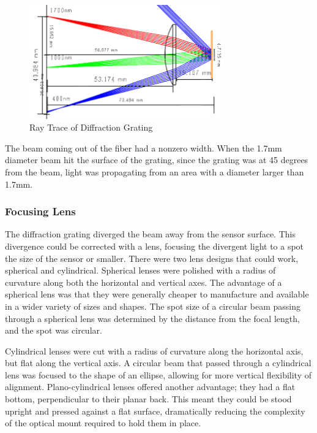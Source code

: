 \begin{figure}[H]
    \caption{Ray Trace of Diffraction Grating}
    \centering
    \includegraphics[width=0.75\textwidth]{images/RayTrace.png}
\end{figure}

The beam coming out of the fiber had a nonzero width. When the 1.7mm diameter beam hit the surface of the grating, since the grating was at 45 degrees from the beam, light was propagating from an area with a diameter larger than 1.7mm.

\subsubsection{Focusing Lens} The diffraction grating diverged the beam away from the sensor surface. This divergence could be corrected with a lens, focusing the divergent light to a spot the size of the sensor or smaller. There were two lens designs that could work, spherical and cylindrical. Spherical lenses were polished with a radius of curvature along both the horizontal and vertical axes. The advantage of a spherical lens was that they were generally cheaper to manufacture and available in a wider variety of sizes and shapes. The spot size of a circular beam passing through a spherical lens was determined by the distance from the focal length, and the spot was circular.

Cylindrical lenses were cut with a radius of curvature along the horizontal axis, but flat along the vertical axis. A circular beam that passed through a cylindrical lens was focused to the shape of an ellipse, allowing for more vertical flexibility of alignment. Plano-cylindrical lenses offered another advantage; they had a flat bottom, perpendicular to their planar back. This meant they could be stood upright and pressed against a flat surface, dramatically reducing the complexity of the optical mount required to hold them in place.

